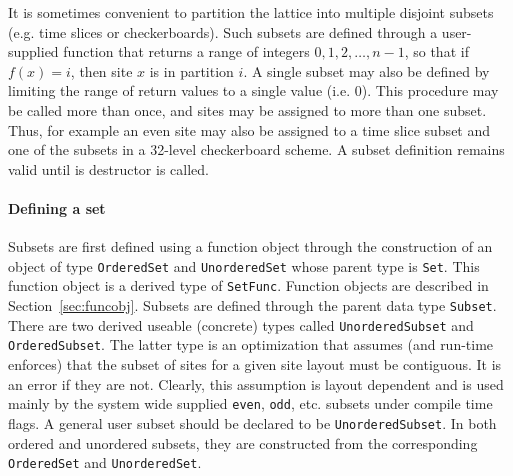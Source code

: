 \documentclass[12pt,letterpaper]{article}
\begin{document}
It is sometimes convenient to partition the lattice into multiple
disjoint subsets (e.g. time slices or checkerboards).  Such subsets
are defined through a user-supplied function that returns a range of
integers $0,1,2,\ldots{},n-1$, so that if $f(x) = i$, then site $x$ is
in partition $i$.  A single subset may also be defined by limiting the
range of return values to a single value (i.e. 0).  This procedure may
be called more than once, and sites may be assigned to more than one
subset.  Thus, for example an even site may also be assigned to a time
slice subset and one of the subsets in a 32-level checkerboard scheme.
A subset definition remains valid until is destructor is called.

\paragraph{Defining a set}

Subsets are first defined using a function object through the
construction of an object of type \verb|OrderedSet| and
\verb|UnorderedSet| whose parent type is \verb|Set|. This function
object is a derived type of \verb|SetFunc|. Function objects are
described in Section~\ref{sec:funcobj}. Subsets are defined through
the parent data type \verb|Subset|. There are two derived useable
(concrete) types called \verb|UnorderedSubset| and
\verb|OrderedSubset|. The latter type is an optimization that assumes
(and run-time enforces) that the subset of sites for a given site
layout must be contiguous. It is an error if they are not. Clearly,
this assumption is layout dependent and is used mainly by the system
wide supplied \verb|even|, \verb|odd|, etc. subsets under compile time
flags. A general user subset should be declared to be
\verb|UnorderedSubset|. In both ordered and unordered subsets, they
are constructed from the corresponding \verb|OrderedSet| and
\verb|UnorderedSet|.
\end{document}
